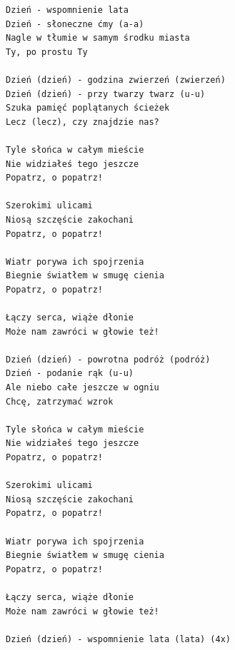 \documentclass[12pt]{article}
\begin{document}
\begin{verbatim}
Dzień - wspomnienie lata
Dzień - słoneczne ćmy (a-a)
Nagle w tłumie w samym środku miasta
Ty, po prostu Ty

Dzień (dzień) - godzina zwierzeń (zwierzeń)
Dzień (dzień) - przy twarzy twarz (u-u)
Szuka pamięć poplątanych ścieżek
Lecz (lecz), czy znajdzie nas?

Tyle słońca w całym mieście
Nie widziałeś tego jeszcze
Popatrz, o popatrz!

Szerokimi ulicami
Niosą szczęście zakochani
Popatrz, o popatrz!

Wiatr porywa ich spojrzenia
Biegnie światłem w smugę cienia
Popatrz, o popatrz!

Łączy serca, wiąże dłonie
Może nam zawróci w głowie też!

Dzień (dzień) - powrotna podróż (podróż)
Dzień - podanie rąk (u-u)
Ale niebo całe jeszcze w ogniu
Chcę, zatrzymać wzrok

Tyle słońca w całym mieście
Nie widziałeś tego jeszcze
Popatrz, o popatrz!

Szerokimi ulicami
Niosą szczęście zakochani
Popatrz, o popatrz!

Wiatr porywa ich spojrzenia
Biegnie światłem w smugę cienia
Popatrz, o popatrz!

Łączy serca, wiąże dłonie
Może nam zawróci w głowie też!

Dzień (dzień) - wspomnienie lata (lata) (4x)
\end{verbatim}
\clearpage
\end{document}
